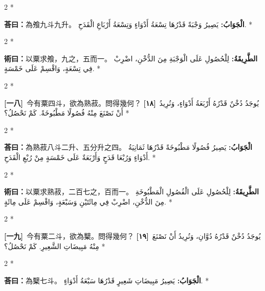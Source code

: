 \documentclass[11pt,a4paper]{article}
\newcommand{\ar}[1]{\arabicfont\beginR #1\endR}
\newcommand{\problemnum}[1]{\textbf{[\ignorespaces#1\unskip]}}
\newenvironment{bilingual}{%
  \begin{paracol}{2}%
  \switchcolumn[0]*%
}{%
  \end{paracol}%
}
\newcommand{\cnline}[1]{\switchcolumn[0]\noindent #1 \switchcolumn[1]}
\newcommand{\arline}[1]{\noindent\ar{#1} \switchcolumn[0]*}
\newenvironment{prob bilingual}{%
  \begin{paracol}{2}%
  \switchcolumn[0]*%
}{%
  \end{paracol}%
  \vspace{0.3em}%
}
\begin{document}
\begin{bilingual}
\cnline{\textcolor{answercolor}{\textbf{荅曰：}}為飧九斗九升。}
\arline{\textcolor{answercolor}{\textbf{الْجَوَابُ:}} يَصِيرُ وَجْبَةً قَدْرُهَا تِسْعَةُ أَدْوَاءٍ وَتِسْعَةُ أَرْبَاعِ الْقَدَحِ.}
\end{bilingual}

\begin{bilingual}
\cnline{%
\textcolor{methodcolor}{\textbf{術曰：}}以粟求飧，九之，五而一。
}
\arline{%
\textcolor{methodcolor}{\textbf{الطَّرِيقَةُ:}} لِلْحُصُولِ عَلَى الْوَجْبَةِ مِنَ الدُّخْنِ، اضْرِبْ فِي تِسْعَةٍ، وَاقْسِمْ عَلَى خَمْسَةٍ.
}
\end{bilingual}

\begin{bilingual}
\cnline{\problemnum{一八}\, 今有粟四斗，欲為熟菽。問得幾何？}
\arline{\problemnum{١٨}\, يُوجَدُ دُخْنٌ قَدْرُهُ أَرْبَعَةُ أَدْوَاءٍ، وَنُرِيدُ أَنْ نَصْنَعَ مِنْهُ فُصُولًا مَطْبُوخَةً. كَمْ نَحْصُلُ؟}
\end{bilingual}

\begin{bilingual}
\cnline{\textcolor{answercolor}{\textbf{荅曰：}}為熟菽八斗二升、五分升之四。}
\arline{\textcolor{answercolor}{\textbf{الْجَوَابُ:}} يَصِيرُ فُصُولًا مَطْبُوخَةً قَدْرُهَا ثَمَانِيَةُ أَدْوَاءٍ وَرُبْعَا قَدَحٍ وَأَرْبَعَةٌ عَلَى خَمْسَةٍ مِنْ رُبْعِ الْقَدَحِ.}
\end{bilingual}

\begin{bilingual}
\cnline{%
\textcolor{methodcolor}{\textbf{術曰：}}以粟求熟菽，二百七之，百而一。
}
\arline{%
\textcolor{methodcolor}{\textbf{الطَّرِيقَةُ:}} لِلْحُصُولِ عَلَى الْفُصُولِ الْمَطْبُوخَةِ مِنَ الدُّخْنِ، اضْرِبْ فِي مِائَتَيْنِ وَسَبْعَةٍ، وَاقْسِمْ عَلَى مِائَةٍ.
}
\end{bilingual}

\begin{bilingual}
\cnline{\problemnum{一九}\, 今有粟二斗，欲為櫱。問得幾何？}
\arline{\problemnum{١٩}\, يُوجَدُ دُخْنٌ قَدْرُهُ دُوَّانِ، وَنُرِيدُ أَنْ نَصْنَعَ مِنْهُ مَبِيضَاتِ الشَّعِيرِ. كَمْ نَحْصُلُ؟}
\end{bilingual}

\begin{bilingual}
\cnline{\textcolor{answercolor}{\textbf{荅曰：}}為櫱七斗。}
\arline{\textcolor{answercolor}{\textbf{الْجَوَابُ:}} يَصِيرُ مَبِيضَاتِ شَعِيرٍ قَدْرُهَا سَبْعَةُ أَدْوَاءٍ.}
\end{bilingual}
\end{document}
